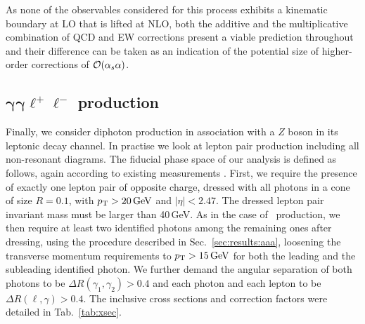 As none of the observables considered for this process 
exhibits a kinematic boundary at LO that is lifted at 
NLO, both the additive and the multiplicative combination 
of QCD and EW corrections present a viable prediction 
throughout and their difference can be taken as an 
indication of the potential size of higher-order corrections 
of $\mathcal{O}(\alpha_s\alpha)$.



\subsection[\texorpdfstring{$\gamma\gamma\ell^+\ell^-$}{aall} production]
           {$\boldsymbol{\gamma\gamma\ell^+\ell^-}$ production}
\label{sec:results:aaz}

Finally, we consider diphoton production in association with 
a $Z$ boson in its leptonic decay channel. 
In practise we look at lepton pair production including 
all non-resonant diagrams.
The fiducial phase space of our analysis is defined as follows, again according 
to existing measurements \cite{Aad:2016sau}. 
First, we require the presence of exactly one lepton pair 
of opposite charge, dressed with all photons in a cone of 
size $R=0.1$, with $p_\text{T}>20\,\text{GeV}$ and $|\eta|<2.47$. 
The dressed lepton pair invariant mass must be larger than 40\,GeV. 
As in the case of \aaw\ production, we then require at least 
two identified photons among the remaining ones after dressing, 
using the procedure described in Sec.\ \ref{sec:results:aaa}, 
loosening the transverse momentum requirements to 
$p_\text{T}>15\,\text{GeV}$ for both the leading and the subleading 
identified photon. 
We further demand the angular separation of both photons 
to be $\Delta R(\gamma_1,\gamma_2)>0.4$ and each photon and 
each lepton to be $\Delta R(\ell,\gamma)>0.4$.
The inclusive cross sections and correction factors were 
detailed in Tab.\ \ref{tab:xsec}.

